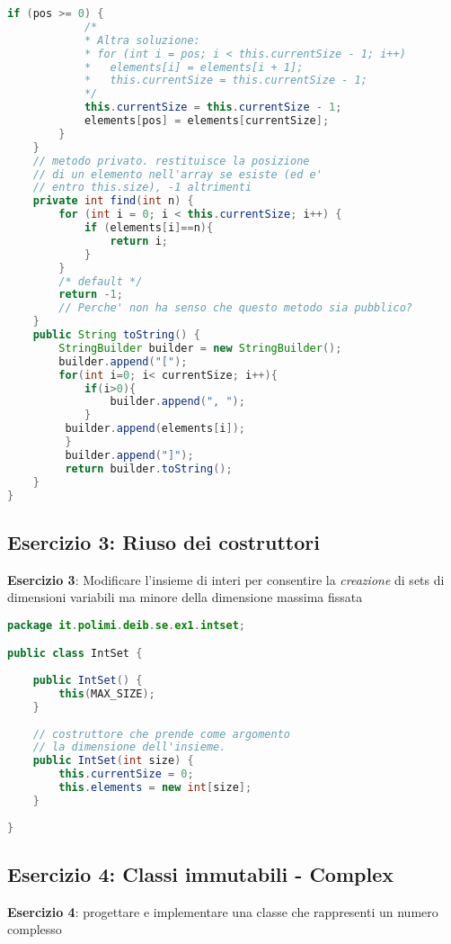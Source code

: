 \documentclass{article}
\begin{document}
\begin{lstlisting}[language=Java,escapechar=|]
    	if (pos >= 0) {
    	    /*
    	    * Altra soluzione:
    	    * for (int i = pos; i < this.currentSize - 1; i++)
    	    *	elements[i] = elements[i + 1];
    	    *	this.currentSize = this.currentSize - 1;
    	    */						
    	    this.currentSize = this.currentSize - 1;
    	    elements[pos] = elements[currentSize];
    	}
    }
    // metodo privato. restituisce la posizione
    // di un elemento nell'array se esiste (ed e'
    // entro this.size), -1 altrimenti
    private int find(int n) {
        for (int i = 0; i < this.currentSize; i++) {
            if (elements[i]==n){
                return i;
            }
        }
        /* default */
        return -1;
        // Perche' non ha senso che questo metodo sia pubblico?
    }
    public String toString() {
        StringBuilder builder = new StringBuilder();
        builder.append("[");
        for(int i=0; i< currentSize; i++){
            if(i>0){
                builder.append(", ");
            }
         builder.append(elements[i]);
         }
         builder.append("]");
         return builder.toString();
    }
}
\end{lstlisting}

\subsection{Esercizio 3: Riuso dei costruttori}
\begin{framed}
\textbf{Esercizio 3}: Modificare l'insieme di interi per consentire la \emph{creazione} di sets di dimensioni variabili ma minore della dimensione massima fissata
\end{framed}


\begin{lstlisting}[language=Java,escapechar=|]
package it.polimi.deib.se.ex1.intset;

public class IntSet {
	
	public IntSet() {
		this(MAX_SIZE);
	}
	
	// costruttore che prende come argomento
	// la dimensione dell'insieme.
	public IntSet(int size) {
		this.currentSize = 0;
		this.elements = new int[size];
	}
	
}
\end{lstlisting}

\subsection{Esercizio 4: Classi immutabili - Complex}
\begin{framed}
\textbf{Esercizio 4}:  progettare e implementare una classe che rappresenti un numero complesso
\end{framed}
\end{document}
